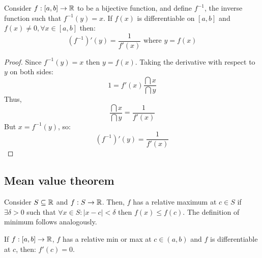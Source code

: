 \begin{theorem}
    Consider $f: [a,b] \to \mathbb{R}$ to be a bijective function, and define $f^{-1}$, the inverse function such that $f^{-1}(y) = x$. If $f(x)$ is differentiable on $[a,b]$ and $f(x) \neq 0, \forall x \in [a,b]$ then:
    \begin{equation*}
        (f^{-1})'(y) = \frac{1}{f'(x)} \text{ where } y = f(x)
    \end{equation*}
\end{theorem}

\begin{proof}
    Since $f^{-1}(y) = x$ then $y = f(x)$. Taking the derivative with respect to $y$ on both sides:
    \begin{equation*}
        1 = f'(x) \frac{\dint x}{\dint y}
    \end{equation*}
    Thus,
    \begin{equation*}
        \frac{\dint x}{\dint y} = \frac{1}{f'(x)}
    \end{equation*}
    But $x = f^{-1}(y)$, so:
    \begin{equation*}
        (f^{-1})'(y) = \frac{1}{f'(x)}
    \end{equation*}
\end{proof}

\subsection{Mean value theorem}

\begin{definition}
    Consider $S \subseteq \mathbb{R}$ and $f: S \to \mathbb{R}$. Then, $f$ has a relative maximum at $c \in S$ if $\exists \delta > 0$ such that $\forall x \in S: |x-c| < \delta$ then $f(x) \leq f(c)$. The definition of minimum follows analogously.
\end{definition}

\begin{theorem}
    If $f:[a,b] \to \mathbb{R}$, $f$ has a relative min or max at $c \in (a,b)$ and $f$ is differentiable at $c$, then: $f'(c) = 0$.
\end{theorem}


